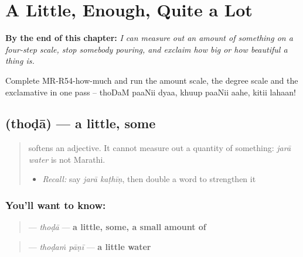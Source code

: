 
\chapter{A Little, Enough, Quite a Lot}
\label{ch:mr-amounts}

\begin{chapteropening}
\textbf{By the end of this chapter:} \emph{I can measure out an amount of something on a four-step scale, stop somebody pouring, and exclaim how big or how beautiful a thing is.}

Complete MR-R54-how-much and run the amount scale, the degree scale and the exclamative in one pass -- thoDaM paaNii dyaa, khuup paaNii aahe, kitii lahaan!
\end{chapteropening}

\section[\texorpdfstring{\mr{थोडा} (thoḍā)}{थोडा (thoḍā)}]{ (thoḍā) — a little, some}

\label{lesson:MR-C54-thoda}



\begin{quote}
\textbf{} softens an adjective. It cannot measure out a quantity of something: \emph{jarā water} is not Marathi.

\begin{itemize}
\raggedright
  \item \emph{Recall:} say \emph{jarā kaṭhīṇ}, then double a word to strengthen it
\end{itemize}
\end{quote}

\subsection*{You'll want to know: }
\begin{quote}
\textbf{} — \emph{thoḍā} — \textbf{a little, some, a small amount of}
\end{quote}

\begin{quote}
\textbf{ } — \emph{thoḍaṁ pāṇī} — \textbf{a little water}
\end{quote}


